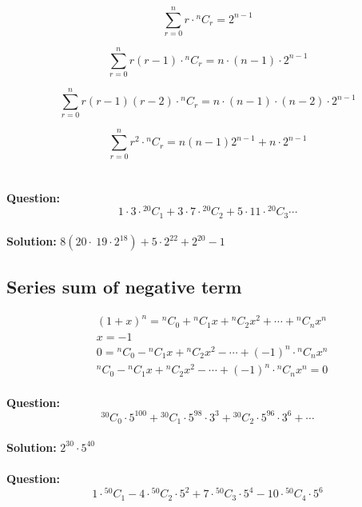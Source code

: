 \documentclass[12pt]{article}
\begin{document}
\[
\boxed{\sum_{r=0}^{n}r \cdot {}^{n}C_{r} = 2^{n-1}}
\]

\[
\boxed{\sum_{r=0}^{n}r(r-1) \cdot {}^{n}C_{r} = n\cdot (n-1)\cdot2^{n-1}}
\]

\[
\boxed{\sum_{r=0}^{n}r(r-1)(r-2) \cdot {}^{n}C_{r} = n\cdot (n-1)\cdot(n-2)\cdot2^{n-1}}
\]

\[
\boxed{\sum_{r=0}^{n}r^2 \cdot {}^{n}C_{r} = n(n-1)2^{n-1}+n\cdot2^{n-1}}
\]
\\
\\
\newpage
\textbf{Question:}
\[
1\cdot3\cdot {}^{20}C_{1}+3\cdot7\cdot {}^{20}C_{2}+5\cdot11\cdot {}^{20}C_{3}\cdots
\]
\\
\textbf{Solution: } $8(20\cdot\ 19\cdot2^{18})+5 \cdot 2^{22}+ 2^{20}-1$ \\
\subsection{Series sum of negative term}
\[
\begin{aligned}
    &(1+x)^n = {}^{n}C_{0}
    + {}^{n}C_{1}x
    + {}^{n}C_{2}x^2
    + \cdots
    + {}^{n}C_{n}x^n \\
    &x = -1 \\
    &0 = {}^{n}C_{0} - {}^{n}C_{1}x + {}^{n}C_{2}x^2 - \cdots+ (-1)^{n} \cdot{}^{n}C_{n}x^n \\
    &\boxed{{}^{n}C_{0} - {}^{n}C_{1}x + {}^{n}C_{2}x^2 - \cdots+ (-1)^{n} \cdot{}^{n}C_{n}x^n = 0}
\end{aligned}
\]
 \\
\textbf{Question: }
\[
{}^{30}C_{0} \cdot 5^{100} +{}^{30}C_{1}\cdot 5^{98} \cdot 3^3+{}^{30}C_{2}\cdot 5^{96} \cdot 3^6+ \cdots
\] \\
\textbf{Solution: } $2^{30}\cdot5^{40}$ \\
\\
\textbf{Question:} 
\[
1 \cdot{}^{50}C_{1} - 4 \cdot{}^{50}C_{2} \cdot 5^{2}+7 \cdot{}^{50}C_{3} \cdot 5^{4}-10\cdot{}^{50}C_{4} \cdot 5^{6}
\]
\newpage
\end{document}
